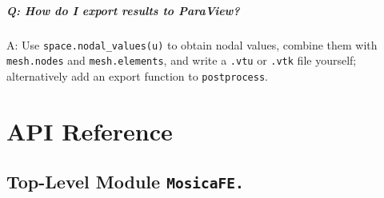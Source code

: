 \documentclass[11pt,oneside]{book}
\theoremstyle{definition}
\theoremstyle{plain}
\newcommand{\code}[1]{\texttt{#1}}
\newcommand{\module}[1]{\texttt{MosicaFE.#1}}
\begin{document}
\paragraph{Q: How do I export results to ParaView?}
A: Use \code{space.nodal\_\allowbreak values(u)} to obtain nodal values, combine them with
\code{mesh.nodes} and \code{mesh.elements}, and write a \code{.vtu} or \code{.vtk}
file yourself; alternatively add an export function to \code{postprocess}.

\appendix

\chapter{API Reference}
\label{app:api}

\section{Top-Level Module \module{}}
\end{document}
